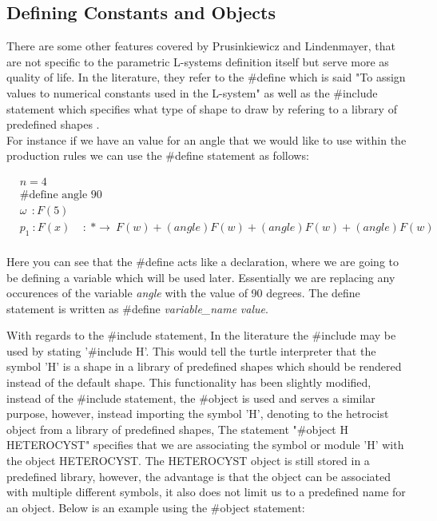 \subsection{Defining Constants and Objects}

\begin{flushleft}

There are some other features covered by Prusinkiewicz and Lindenmayer, that are not specific to the parametric L-systems definition itself but serve more as quality of life. In the literature, they refer to the \#define which is said "To assign values to numerical constants used in the L-system" as well as the \#include statement which specifies what type of shape to draw by refering to a library of predefined shapes \cite{prusinkiewicz2012algorithmic}. \\
For instance if we have an value for an angle that we would like to use within the production rules we can use the \#define statement as follows:

\vspace{5mm}

\begin{equation} \label{define statement example}
\begin{aligned}
	&n=4 \\
	&\textrm{\#define angle 90}\\
	&\omega~~ : F(5)\\
	&p_1~ :  F(x)~~~~~ :~ * \rightarrow~ F(w)+(angle)F(w)+(angle)F(w)+(angle)F(w)\\
\end{aligned}
\end{equation}

\vspace{5mm}

Here you can see that the \#define acts like a declaration, where we are going to be defining a variable which will be used later. Essentially we are replacing any occurences of the variable \textit{angle} with the value of 90 degrees. The define statement is written as  \#define \textit{variable\_name} \textit{value}. \\

\vspace{5mm}

With regards to the \#include statement, In the literature the \#include may be used by stating '\#include H'. This would tell the turtle interpreter that the symbol 'H' is a shape in a library of predefined shapes which should be rendered instead of the default shape. This functionality has been slightly modified, instead of the \#include statement, the \#object is used and serves a similar purpose, however, instead importing the symbol 'H', denoting to the hetrocist object from a library of predefined shapes, The statement "\#object H HETEROCYST" specifies that we are associating the symbol or module 'H' with the object HETEROCYST. The HETEROCYST object is still stored in a predefined library, however, the advantage is that the object can be associated with multiple different symbols, it also does not limit us to a predefined name for an object. Below is an example using the \#object statement: \\


\end{flushleft}
